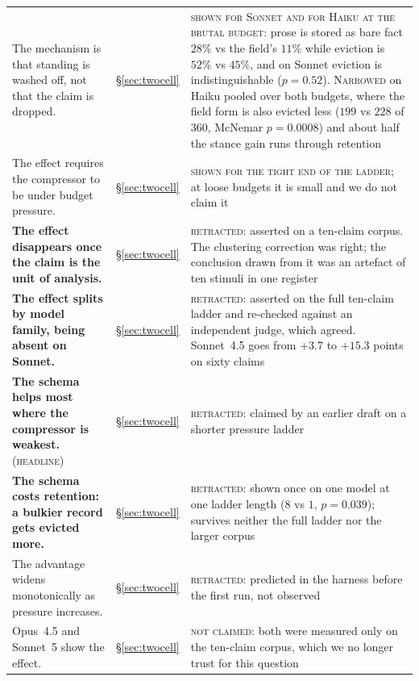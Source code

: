 \documentclass[11pt]{article}
\begin{document}
{\begin{longtable}{@{}L{0.46\textwidth} L{0.18\textwidth} L{0.28\textwidth}@{}}
The mechanism is that standing is washed off, not that the claim is dropped. &
\S\ref{sec:twocell} & \textsc{shown for Sonnet and for Haiku at the brutal budget}: prose
is stored as bare fact $28\%$ vs the field's $11\%$ while eviction is $52\%$ vs $45\%$,
and on Sonnet eviction is indistinguishable ($p=0.52$). \textsc{Narrowed} on Haiku pooled
over both budgets, where the field form is also evicted less ($199$ vs $228$ of $360$,
McNemar $p=0.0008$) and about half the stance gain runs through retention \\

The effect requires the compressor to be under budget pressure. & \S\ref{sec:twocell} &
\textsc{shown for the tight end of the ladder}; at loose budgets it is small and we do
not claim it \\

\textbf{The effect disappears once the claim is the unit of analysis.} &
\S\ref{sec:twocell} & \textsc{retracted}: asserted on a ten-claim corpus. The clustering
correction was right; the conclusion drawn from it was an artefact of ten stimuli in one
register \\

\textbf{The effect splits by model family, being absent on Sonnet.} &
\S\ref{sec:twocell} & \textsc{retracted}: asserted on the full ten-claim ladder and
re-checked against an independent judge, which agreed. Sonnet~4.5 goes from $+3.7$ to
$+15.3$ points on sixty claims \\

\textbf{The schema helps most where the compressor is weakest.} \textsc{(headline)} & \S\ref{sec:twocell} &
\textsc{retracted}: claimed by an earlier draft on a shorter pressure ladder \\

\textbf{The schema costs retention: a bulkier record gets evicted more.} &
\S\ref{sec:twocell} & \textsc{retracted}: shown once on one model at one ladder length
($8$ vs $1$, $p=0.039$); survives neither the full ladder nor the larger corpus \\

The advantage widens monotonically as pressure increases. & \S\ref{sec:twocell} &
\textsc{retracted}: predicted in the harness before the first run, not observed \\

Opus~4.5 and Sonnet~5 show the effect. & \S\ref{sec:twocell} & \textsc{not claimed}:
both were measured only on the ten-claim corpus, which we no longer trust for this
question \\


\end{longtable}}
\end{document}
